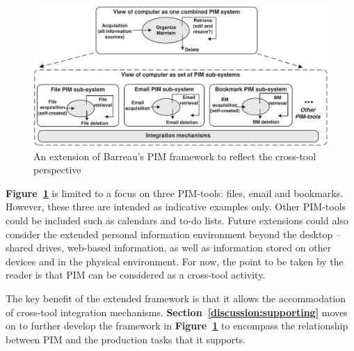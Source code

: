 \begin{figure}[htbp]
	\begin{center}
		\leavevmode
		\includegraphics[width=\textwidth]{pictures/discussion/PIM-cross-tool-model.pdf}
	\end{center}
	\caption{An extension of Barreau's PIM framework to reflect the cross-tool perspective}
	\label{fig:discussion:PIM-cross-tool-model}
\end{figure}



\textbf{Figure~\ref{fig:discussion:PIM-cross-tool-model}} is limited to a focus on three PIM-tools: files, email and bookmarks.  However, these three are intended as indicative examples only.  Other PIM-tools could be included such as calendars and to-do lists.  Future extensions could also consider the extended personal information environment beyond the desktop -- shared drives, web-based information, as well as information stored on other devices and in the physical environment.  For now, the point to be taken by the reader is that PIM can be considered as a cross-tool activity.


The key benefit of the extended framework is that it allows the accommodation of cross-tool integration mechanisms.
\textbf{Section~\ref{discussion:supporting}} moves on to further develop the framework in \textbf{Figure~\ref{fig:discussion:PIM-cross-tool-model}} to encompass the relationship between PIM and the production tasks that it supports.








